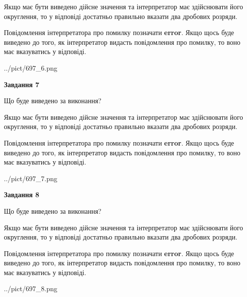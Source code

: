 \documentclass[12pt, ukrainian]{article}
\begin{document}
{\begin {Large}
Якщо має бути виведено дійсне значення та інтерпретатор має здійснювати його округлення, 
то у відповіді достатньо правильно вказати два дробових розряди.

Повідомлення інтерпретатора про помилку позначати \textbf{error}.
Якщо щось буде виведено до того, як інтерпретатор видасть повідомлення про помилку, 
то воно має вказуватись у відповіді. \par

\begin{center}
	{../pict/697_6.png}
\end{center}
\newpage

{\begin {center}\textbf{Завдання 7}\end {center}}\par
Що буде виведено за виконання? \par

Якщо має бути виведено дійсне значення та інтерпретатор має здійснювати його округлення, 
то у відповіді достатньо правильно вказати два дробових розряди.

Повідомлення інтерпретатора про помилку позначати \textbf{error}.
Якщо щось буде виведено до того, як інтерпретатор видасть повідомлення про помилку, 
то воно має вказуватись у відповіді. \par

\begin{center}
	{../pict/697_7.png}
\end{center}
\newpage

{\begin {center}\textbf{Завдання 8}\end {center}}\par
Що буде виведено за виконання? \par

Якщо має бути виведено дійсне значення та інтерпретатор має здійснювати його округлення, 
то у відповіді достатньо правильно вказати два дробових розряди.

Повідомлення інтерпретатора про помилку позначати \textbf{error}.
Якщо щось буде виведено до того, як інтерпретатор видасть повідомлення про помилку, 
то воно має вказуватись у відповіді. \par

\begin{center}
	{../pict/697_8.png}
\end{center}
\newpage


\end{Large}}
\end{document}
